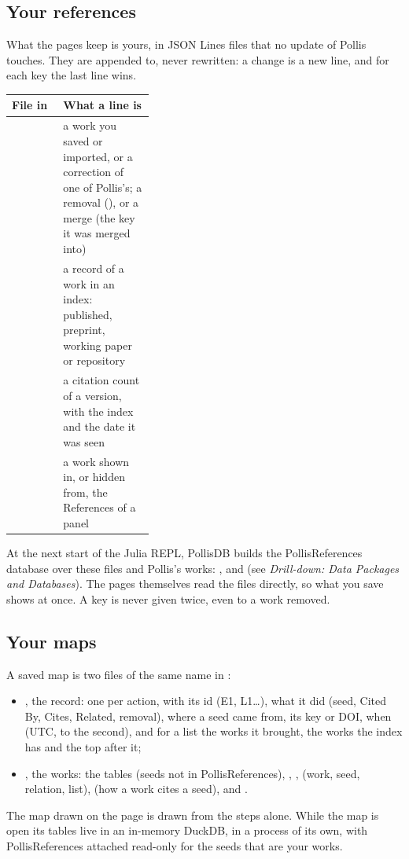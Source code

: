 \subsection{Your references}
What the pages keep is yours, in JSON Lines files that no update of Pollis touches. They are appended to, never rewritten:
a change is a new line, and for each key the last line wins.
\begin{center}\small
\renewcommand{\arraystretch}{1.2}
\begin{tabularx}{\linewidth}{@{}p{0.36\linewidth}L@{}}
\toprule
\textbf{File in } & \textbf{What a line is}\\
\midrule
{} & a work you saved or imported, or a correction of one of Pollis's; a removal (), or a merge (the key it was merged into)\\
 & a record of a work in an index: published, preprint, working paper or repository\\
 & a citation count of a version, with the index and the date it was seen\\
 & a work shown in, or hidden from, the References of a panel\\
\bottomrule
\end{tabularx}
\end{center}

At the next start of the Julia REPL, PollisDB builds the PollisReferences database over these files and Pollis's works:
,  and  (see \emph{Drill-down: Data Packages and Databases}). The pages
themselves read the files directly, so what you save shows at once. A key is never given twice, even to a work removed.

\subsection{Your maps}
A saved map is two files of the same name in :
\begin{itemize}
  \item {}, the record: one \file{[[step]]} per action, with its id (E1, L1\dots), what it did (seed, Cited By,
    Cites, Related, removal), where a seed came from, its key or DOI, when (UTC, to the second), and for a list the works
    it brought, the works the index has and the top after it;
  \item {}, the works: the tables  (seeds not in PollisReferences), ,
    ,  (work, seed, relation, list),  (how a work cites a seed),
     and .
\end{itemize}
The map drawn on the page is drawn from the steps alone. While the map is open its tables live in an in-memory DuckDB, in
a process of its own, with PollisReferences attached read-only for the seeds that are your works.

